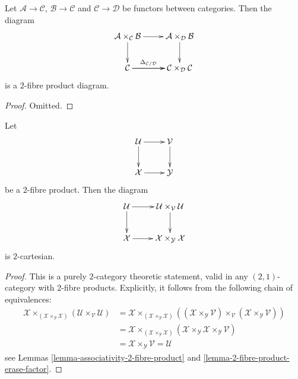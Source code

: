 \begin{lemma}
\label{lemma-fibre-product-after-map}
Let $\mathcal{A} \to \mathcal{C}$, $\mathcal{B} \to \mathcal{C}$
and $\mathcal{C} \to \mathcal{D}$ be functors between categories.
Then the diagram
$$
\xymatrix{
\mathcal{A} \times_\mathcal{C} \mathcal{B} \ar[d] \ar[r] &
\mathcal{A} \times_\mathcal{D} \mathcal{B} \ar[d] \\
\mathcal{C} \ar[r]^-{\Delta_{\mathcal{C}/\mathcal{D}}} \ar[r] &
\mathcal{C} \times_\mathcal{D} \mathcal{C}
}
$$
is a $2$-fibre product diagram. 
\end{lemma}

\begin{proof}
Omitted.
\end{proof}

\begin{lemma}
\label{lemma-base-change-diagonal}
Let
$$
\xymatrix{
\mathcal{U} \ar[d] \ar[r] & \mathcal{V} \ar[d] \\
\mathcal{X} \ar[r] & \mathcal{Y}
}
$$
be a $2$-fibre product. Then the diagram
$$
\xymatrix{
\mathcal{U} \ar[d] \ar[r] &
\mathcal{U} \times_{\mathcal{V}} \mathcal{U} \ar[d] \\
\mathcal{X} \ar[r] &
\mathcal{X} \times_{\mathcal{Y}} \mathcal{X}
}
$$
is $2$-cartesian.
\end{lemma}

\begin{proof}
This is a purely $2$-category theoretic statement, valid in any
$(2, 1)$-category with $2$-fibre products. Explicitly, it follows
from the following chain of equivalences:
\begin{align*}
\mathcal{X} \times_{(\mathcal{X} \times_{\mathcal{Y}} \mathcal{X})}
(\mathcal{U} \times_{\mathcal{V}} \mathcal{U})
& =
\mathcal{X} \times_{(\mathcal{X} \times_{\mathcal{Y}} \mathcal{X})}
((\mathcal{X} \times_{\mathcal{Y}} \mathcal{V})
\times_{\mathcal{V}} (\mathcal{X} \times_{\mathcal{Y}} \mathcal{V})) \\
& =
\mathcal{X} \times_{(\mathcal{X} \times_{\mathcal{Y}} \mathcal{X})}
(\mathcal{X} \times_{\mathcal{Y}} \mathcal{X}
\times_{\mathcal{Y}} \mathcal{V}) \\
& =
\mathcal{X} \times_{\mathcal{Y}} \mathcal{V} = \mathcal{U}
\end{align*}
see
Lemmas \ref{lemma-associativity-2-fibre-product} and
\ref{lemma-2-fibre-product-erase-factor}.
\end{proof}








